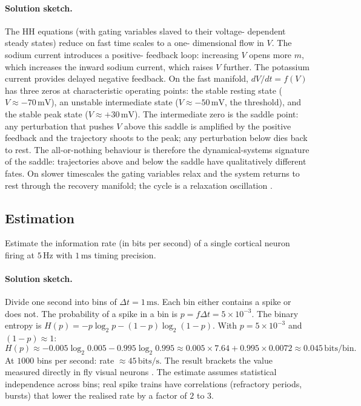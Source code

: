 \paragraph{Solution sketch.}
The HH equations (with gating variables slaved to their voltage-
dependent steady states) reduce on fast time scales to a one-
dimensional flow in $V$. The sodium current introduces a positive-
feedback loop: increasing $V$ opens more $m$, which increases the
inward sodium current, which raises $V$ further. The potassium
current provides delayed negative feedback. On the fast manifold,
$dV/dt = f(V)$ has three zeros at characteristic operating points:
the stable resting state ($V \approx -70\,\text{mV}$), an unstable
intermediate state ($V \approx -50\,\text{mV}$, the threshold), and
the stable peak state ($V \approx +30\,\text{mV}$). The intermediate
zero is the saddle point: any perturbation that pushes $V$ above this
saddle is amplified by the positive feedback and the trajectory shoots
to the peak; any perturbation below dies back to rest. The
all-or-nothing behaviour is therefore the dynamical-systems signature
of the saddle: trajectories above and below the saddle have
qualitatively different fates. On slower timescales the gating
variables relax and the system returns to rest through the recovery
manifold; the cycle is a relaxation oscillation
\cite[ch.~7]{text:v6c07-dayan-abbott-2001}.

\subsection*{Estimation}

\begin{exercise}
Estimate the information rate (in bits per second) of a single
cortical neuron firing at $5\,\text{Hz}$ with $1\,\text{ms}$ timing
precision.
\end{exercise}

\paragraph{Solution sketch.}
Divide one second into bins of $\Delta t = 1\,\text{ms}$. Each bin
either contains a spike or does not. The probability of a spike in
a bin is $p = f \Delta t = 5 \times 10^{-3}$. The binary entropy is
$H(p) = -p \log_2 p - (1-p) \log_2 (1-p)$. With $p = 5 \times 10^{-3}$
and $(1-p) \approx 1$:
\[
H(p) \approx -0.005 \log_2 0.005 - 0.995 \log_2 0.995
\approx 0.005 \times 7.64 + 0.995 \times 0.0072
\approx 0.045\,\text{bits/bin}.
\]
At $1000$ bins per second: rate $\approx 45\,\text{bits/s}$. The result
brackets the value measured directly in fly visual neurons
\cite{paper:v6c07-strong-1998}. The estimate assumes statistical
independence across bins; real spike trains have correlations
(refractory periods, bursts) that lower the realised rate by a
factor of $2$ to $3$.

